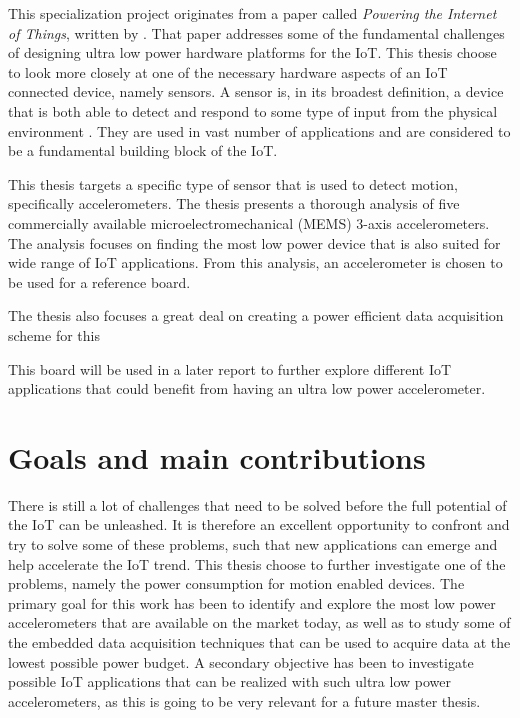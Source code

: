 
This specialization project originates from a paper called \textit{Powering the Internet of Things}, written by \cite{jayakumar14}. That paper addresses some of the fundamental challenges of designing ultra low power hardware platforms for the IoT. This thesis choose to look more closely at one of the necessary hardware aspects of an IoT connected device, namely sensors. A sensor is, in its broadest definition, a device that is both able to detect and respond to some type of input from the physical environment \cite{wigmore12}. They are used in vast number of applications and are considered to be a fundamental building block of the IoT. 

This thesis targets a specific type of sensor that is used to detect motion, specifically accelerometers. The thesis presents a thorough analysis of five commercially available microelectromechanical (MEMS) 3-axis accelerometers. The analysis focuses on finding the most low power device that is also suited for wide range of IoT applications. From this analysis, an accelerometer is chosen to be used for a reference board. 

The thesis also focuses a great deal on creating a power efficient data acquisition scheme for this

This board will be used in a later report to further explore different IoT applications that could benefit from having an ultra low power accelerometer.


\section{Goals and main contributions}

There is still a lot of challenges that need to be solved before the full potential of the IoT can be unleashed. It is therefore an excellent opportunity to confront and try to solve some of these problems, such that new applications can emerge and help accelerate the IoT trend. This thesis choose to further investigate one of the problems, namely the power consumption for motion enabled devices. The primary goal for this work has been to identify and explore the most low power accelerometers that are available on the market today, as well as to study some of the embedded data acquisition techniques that can be used to acquire data at the lowest possible power budget. A secondary objective has been to investigate possible IoT applications that can be realized with such ultra low power accelerometers, as this is going to be very relevant for a future master thesis.

